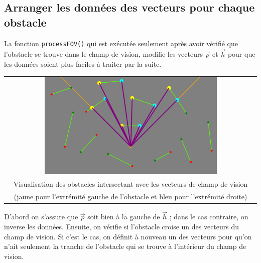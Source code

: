 \documentclass[11pt,french,a4paper,]{article}
\begin{document}
\hypertarget{arranger-les-donnuxe9es-des-vecteurs-pour-chaque-obstacle}{%
\subsection{Arranger les données des vecteurs pour chaque
obstacle}\label{arranger-les-donnuxe9es-des-vecteurs-pour-chaque-obstacle}}

La fonction \texttt{processFOV()} qui est exécutée seulement après avoir
vérifié que l'obstacle se trouve dans le champ de vision, modifie les
vecteurs \(\vec{p}\) et \(\vec{h}\) pour que les données soient plus
faciles à traiter par la suite.

\begin{longtable}[]{@{}c@{}}
\toprule
\endhead
\begin{minipage}[t]{0.97\columnwidth}\centering
\includegraphics[width=0.7\textwidth,height=\textheight]{../img/New_rays_intersections_more.png}\strut
\end{minipage}\tabularnewline
\begin{minipage}[t]{0.97\columnwidth}\centering
Visualisation des obstacles intersectant avec les vecteurs de champ de
vision\strut
\end{minipage}\tabularnewline
\begin{minipage}[t]{0.97\columnwidth}\centering
(jaune pour l'extrémité gauche de l'obstacle et bleu pour l'extrémité
droite)\strut
\end{minipage}\tabularnewline
\bottomrule
\end{longtable}

D'abord on s'assure que \(\vec{p}\) soit bien à la gauche de \(\vec{h}\)
; dans le cas contraire, on inverse les données. Ensuite, on vérifie si
l'obstacle croise un des vecteurs du champ de vision. Si c'est le cas,
on définit à nouveau un des vecteurs pour qu'on n'ait seulement la
tranche de l'obstacle qui se trouve à l'intérieur du champ de vision.
\end{document}
